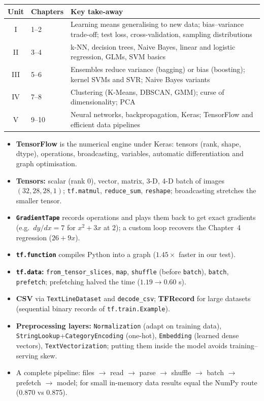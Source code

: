 \begin{center}
\small
\begin{tabular}{@{}clp{8.3cm}@{}}
\toprule
\textbf{Unit} & \textbf{Chapters} & \textbf{Key take-away}\\
\midrule
I & 1--2 & Learning means generalising to new data; bias--variance trade-off; test loss, cross-validation, sampling distributions\\
II & 3--4 & k-NN, decision trees, Naive Bayes, linear and logistic regression, GLMs, SVM basics\\
III & 5--6 & Ensembles reduce variance (bagging) or bias (boosting); kernel SVMs and SVR; Naive Bayes variants\\
IV & 7--8 & Clustering (K-Means, DBSCAN, GMM); curse of dimensionality; PCA\\
V & 9--10 & Neural networks, backpropagation, Keras; TensorFlow and efficient data pipelines\\
\bottomrule
\end{tabular}
\end{center}

\begin{summary}
\begin{itemize}
  \item \textbf{TensorFlow} is the numerical engine under Keras: tensors (rank, shape, dtype), operations, broadcasting, variables, automatic differentiation and graph optimisation.
  \item \textbf{Tensors:} scalar (rank 0), vector, matrix, 3-D, 4-D batch of images $(32,28,28,1)$; \texttt{tf.matmul}, \texttt{reduce\_sum}, \texttt{reshape}; broadcasting stretches the smaller tensor.
  \item \textbf{\texttt{GradientTape}} records operations and plays them back to get exact gradients (e.g.\ $dy/dx=7$ for $x^2+3x$ at $2$); a custom loop recovers the Chapter~4 regression ($26+9x$).
  \item \textbf{\texttt{tf.function}} compiles Python into a graph ($1.45\times$ faster in our test).
  \item \textbf{\texttt{tf.data}:} \texttt{from\_tensor\_slices}, \texttt{map}, \texttt{shuffle} (before \texttt{batch}), \texttt{batch}, \texttt{prefetch}; prefetching halved the time ($1.19\to0.60$ s).
  \item \textbf{CSV} via \texttt{TextLineDataset} and \texttt{decode\_csv}; \textbf{TFRecord} for large datasets (sequential binary records of \texttt{tf.train.Example}).
  \item \textbf{Preprocessing layers:} \texttt{Normalization} (adapt on training data), \texttt{StringLookup}+\texttt{CategoryEncoding} (one-hot), \texttt{Embedding} (learned dense vectors), \texttt{TextVectorization}; putting them inside the model avoids training--serving skew.
  \item A complete pipeline: files $\to$ read $\to$ parse $\to$ shuffle $\to$ batch $\to$ prefetch $\to$ model; for small in-memory data results equal the NumPy route (0.870 vs 0.875).
\end{itemize}
\end{summary}

